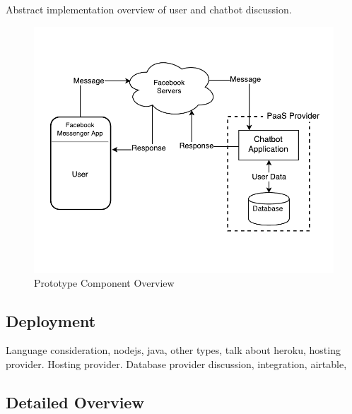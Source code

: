 Abstract implementation overview of user and chatbot discussion.

\begin{figure}[H]
    \centering
    \includegraphics[width=5.1in]{../resources/diagrams/chatbot-component-overview.pdf}
    \caption{Prototype Component Overview}
    \label{fig:prototype_component_overview}
\end{figure}

\subsection{Deployment}

Language consideration, nodejs, java, other types, talk about heroku, hosting provider. Hosting provider.
Database provider discussion, integration, airtable,

\subsection*{Detailed Overview}

